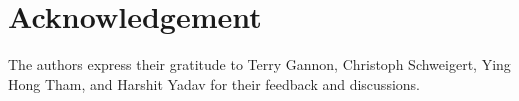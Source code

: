 \section*{Acknowledgement}

The authors express their gratitude to Terry Gannon, Christoph Schweigert,
Ying Hong Tham, and Harshit Yadav for their feedback and discussions.
